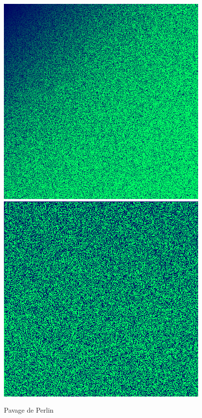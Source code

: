 \documentclass[a4paper,10pt]{article}
\begin{document}
\begin{figure}[h]
    \centering
    \includegraphics[scale=0.5]{noise.png}
    \includegraphics[scale=0.5]{noise1.png}
    \caption{Pavage de Perlin}
\end{figure}
\end{document}
